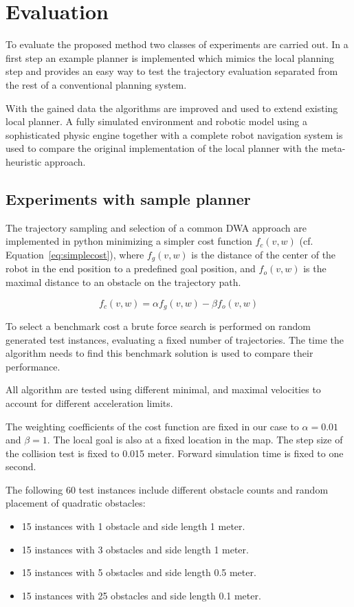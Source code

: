 \chapter{Evaluation}\label{ch:eval}
To evaluate the proposed method two classes of experiments are carried out. In a first step an example planner is implemented which mimics the local planning step and provides an easy way to test the trajectory evaluation separated from the rest of a conventional planning system.

With the gained data the algorithms are improved and used to extend existing local planner. A fully simulated environment and robotic model using a sophisticated physic engine together with a complete robot navigation system is used to compare the original implementation of the local planner with the meta-heuristic approach.
 
\section{Experiments with sample planner}
The trajectory sampling and selection of a common DWA approach are implemented in python minimizing a simpler cost function $f_c(v,w)$ (cf. Equation~\ref{eq:simplecost}), where $f_g(v,w)$ is the distance of the center of the robot in the end position to a predefined goal position, and $f_o(v,w)$ is the maximal distance to an obstacle on the trajectory path.

\begin{equation}
   f_c(v,w)=\alpha f_g(v,w) - \beta f_o(v,w)
   \label{eq:simplecost}
\end{equation}

To select a benchmark cost a brute force search is performed on random generated test instances, evaluating a fixed number of trajectories. 
The time the algorithm needs to find this benchmark solution is used to compare their performance.

All algorithm are tested using different minimal, and maximal velocities to account for different acceleration limits. 

The weighting coefficients of the cost function are fixed in our case to $\alpha=0.01$ and $\beta=1$. The local goal is also at a fixed location in the map. 
The step size of the collision test is fixed to 0.015 meter. 
Forward simulation time is fixed to one second. 

The following 60 test instances include different obstacle counts and random placement of quadratic obstacles:
\begin{itemize}
\item 15 instances with 1 obstacle and side length 1 meter.
\item 15 instances with 3 obstacles and side length 1 meter.
\item 15 instances with 5 obstacles and side length 0.5 meter.
\item 15 instances with 25 obstacles and side length 0.1 meter.
\end{itemize}

